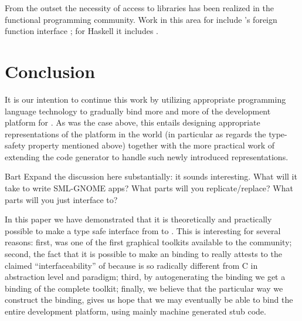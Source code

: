 \documentclass[workingdraft]{usetex-v1}
\begin{document}
From the outset the necessity of access to libraries has been realized
in the functional programming community. Work in this area for \sml
include 
\smlnj's foreign function interface \cite{Blume:2001:nlffi};
for Haskell it includes \cite{Finne:1999:CallingHellFromHeaven}.



\section{Conclusion}
\label{sec:conclusion}

It is our intention to continue this work by utilizing appropriate
programming language technology to gradually bind more and more of the
\gnome development platform for \sml. As was the case above, this
entails designing appropriate representations of the platform in the
\sml world (in particular as regards the type-safety property mentioned
above) together with the more practical work of extending the code
generator to handle such newly introduced representations.


\begin{ednote}{Bart}
  Expand the discussion here substantially: it sounds
interesting.  What will it take to write SML-GNOME apps?
What parts will you replicate/replace?  What parts will you
just interface to?

\end{ednote}

In this paper we have demonstrated that it is theoretically and
practically possible to make a type safe interface from \sml to \gtk.
This is interesting for several reasons: first, \mgtk was one of the
first graphical toolkits available to the \sml community; second, the
fact that it is possible to make an \sml binding to \gtk really
attests to the claimed ``interfaceability'' of \gtk because \sml is so
radically different from C in abstraction level and paradigm; third,
by autogenerating the binding we get a binding of the complete \gtk
toolkit; finally, we believe that the particular way we construct the
binding, gives us hope that we may eventually be able to bind the
entire \gnome development platform, using mainly machine generated
stub code.



\end{document}
